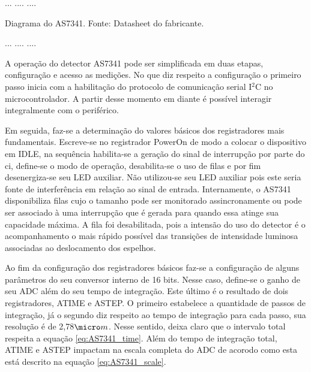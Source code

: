 \documentclass[oneside,openright,12pt]{ufsm_2021} %
\begin{document}
            \par ...    ....    ....
            \par Diagrama do AS7341. Fonte: Datasheet do fabricante.
            \par ...    ....    ....   

            
            \par A operação do detector AS7341 pode ser simplificada em duas etapas, configuração e acesso as medições. No que diz respeito a configuração o primeiro passo inicia com a habilitação do protocolo de comunicação serial I$^2$C no microcontrolador. A partir desse momento em diante é possível interagir integralmente com o periférico. 
            \par Em seguida, faz-se a determinação do valores básicos dos registradores mais fundamentais. Escreve-se no registrador PowerOn de modo a colocar o dispositivo em IDLE, na sequência habilita-se a geração do sinal de interrupção por parte do ci, define-se o modo de operação, desabilita-se o uso de filas e por fim desenergiza-se seu LED auxiliar. Não utilizou-se seu LED auxiliar pois este seria fonte de interferência em relação ao sinal de entrada. Internamente, o AS7341 disponibiliza filas cujo o tamanho pode ser monitorado assincronamente ou pode ser associado à uma interrupção que é gerada para quando essa atinge sua capacidade máxima. A fila foi desabilitada, pois a intensão do uso do detector é o acompanhamento o mais rápido possível das transições de intensidade luminosa associadas ao deslocamento dos espelhos.
            \par Ao fim da configuração dos registradores básicos faz-se a configuração de alguns parâmetros do seu conversor interno de 16 bits. Nesse caso, define-se o ganho de seu ADC além do seu tempo de integração. Este último é o resultado de dois registradores, ATIME e ASTEP. O primeiro estabelece a quantidade de passos de integração, já o segundo diz respeito ao tempo de integração para cada passo, sua resolução é de 2,78$\micro m$. Nesse sentido, \cite{data:DataAS7341} deixa claro que o intervalo total respeita a equação \ref{eq:AS7341_time}. Além do tempo de integração total, ATIME e ASTEP impactam na escala completa do ADC de acorodo como esta está descrito na equação \ref{eq:AS7341_scale}.
\end{document}
